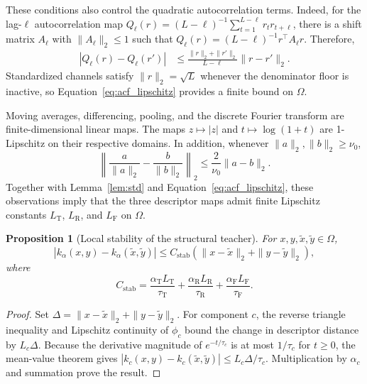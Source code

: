 \documentclass[pdflatex,sn-mathphys-num]{sn-jnl}
\newcommand{\1}{\mathbf{1}}
\theoremstyle{plain}
\newtheorem{proposition}{Proposition}
\begin{document}
	These conditions also control the quadratic autocorrelation terms.
	Indeed, for the lag-$\ell$ autocorrelation map $Q_\ell(r)=(L-\ell)^{-1}\sum_{t=1}^{L-\ell}r_tr_{t+\ell}$, there is a shift matrix $A_\ell$ with $\|A_\ell\|_2\leq1$ such that
	$Q_\ell(r)=(L-\ell)^{-1}r^\top A_\ell r$. Therefore,
	\begin{align}
		|Q_\ell(r)-Q_\ell(r')|
		&\leq
		\frac{\|r\|_2+\|r'\|_2}{L-\ell}
		\|r-r'\|_2.
		\label{eq:acf_lipschitz}
	\end{align}
	Standardized channels satisfy $\|r\|_2=\sqrt{L}$ whenever the
	denominator floor is inactive, so Equation~\eqref{eq:acf_lipschitz}
	provides a finite bound on $\Omega$.
	
	Moving averages, differencing, pooling, and the discrete Fourier
	transform are finite-dimensional linear maps. The maps
	$z\mapsto|z|$ and $t\mapsto\log(1+t)$ are 1-Lipschitz on their
	respective domains. In addition, whenever
	$\|a\|_2,\|b\|_2\geq\nu_0$,
	\begin{equation}
		\left\|
		\frac{a}{\|a\|_2}
		-
		\frac{b}{\|b\|_2}
		\right\|_2
		\leq
		\frac{2}{\nu_0}\|a-b\|_2.
		\label{eq:normalization_lipschitz}
	\end{equation}
	Together with Lemma~\ref{lem:std} and
	Equation~\eqref{eq:acf_lipschitz}, these observations imply that the
	three descriptor maps admit finite Lipschitz constants
	$L_{\mathrm{T}}$, $L_{\mathrm{R}}$, and $L_{\mathrm{F}}$ on
	$\Omega$.
	
	\begin{proposition}[Local stability of the structural teacher]
		\label{prop:teacherstab}
		For $x,y,\widetilde x,\widetilde y\in\Omega$,
		\begin{equation}
			\left|
			k_\alpha(x,y)
			-
			k_\alpha(\widetilde x,\widetilde y)
			\right|
			\leq
			C_{\mathrm{stab}}
			\left(
			\|x-\widetilde x\|_2
			+
			\|y-\widetilde y\|_2
			\right),
			\label{eq:teacherstab}
		\end{equation}
		where
		\begin{equation}
			C_{\mathrm{stab}}
			=
			\frac{\alpha_{\mathrm{T}}L_{\mathrm{T}}}{\tau_{\mathrm{T}}}
			+
			\frac{\alpha_{\mathrm{R}}L_{\mathrm{R}}}{\tau_{\mathrm{R}}}
			+
			\frac{\alpha_{\mathrm{F}}L_{\mathrm{F}}}{\tau_{\mathrm{F}}}.
			\label{eq:stability_constant}
		\end{equation}
	\end{proposition}
	
	\begin{proof}
		Set $\Delta=\|x-\widetilde x\|_2+\|y-\widetilde y\|_2$. For component $c$, the reverse triangle inequality and Lipschitz continuity of $\phi_c$ bound the change in descriptor distance by $L_c\Delta$. Because the derivative magnitude of $e^{-t/\tau_c}$ is at most $1/\tau_c$ for $t\geq0$, the mean-value theorem gives $|k_c(x,y)-k_c(\widetilde x,\widetilde y)|\leq L_c\Delta/\tau_c$. Multiplication by $\alpha_c$ and summation prove the result.
	\end{proof}
	
\end{document}
